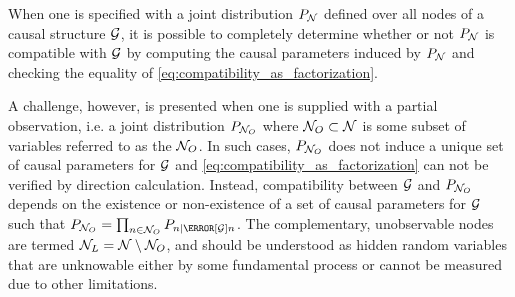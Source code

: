 \documentclass[aps, 10pt, english, twoside, pra, nofootinbib, tightenlines, longbibliography, superscriptaddress]{revtex4-1}
\begin{document}
    When one is specified with a joint distribution $\prob[\nodes]$ defined over all nodes of a causal structure $\mathcal{G}$, it is possible to completely determine whether or not $\prob[\nodes]$ is compatible with $\mathcal{G}$ by computing the causal parameters induced by $\prob[\nodes]$ and checking the equality of \cref{eq:compatibility_as_factorization}.

    A challenge, however, is presented when one is supplied with a partial observation, i.e. a joint distribution $\prob[\nodes_{O}]$ where $\mathcal{N}_{O} \subset \mathcal{N}$ is some subset of variables referred to as the  $\mathcal{N}_O$. In such cases, $\prob[\nodes_{O}]$ does not induce a unique set of causal parameters for $\mathcal{G}$ and \cref{eq:compatibility_as_factorization} can not be verified by direction calculation. Instead, compatibility between $\mathcal{G}$ and $\prob[\nodes_{O}]$ depends on the existence or non-existence of a set of causal parameters for $\mathcal{G}$ such that $\prob[\nodes_{O}] = \prod_{n \in \nodes_{O}} \prob[n \mid \Pa[\graph]{n}]$. The complementary, unobservable nodes are termed  $\mathcal{N}_L = \mathcal{N} \setminus \mathcal{N}_{O}$, and should be understood as hidden random variables that are unknowable either by some fundamental process or cannot be measured due to other limitations.
\end{document}
